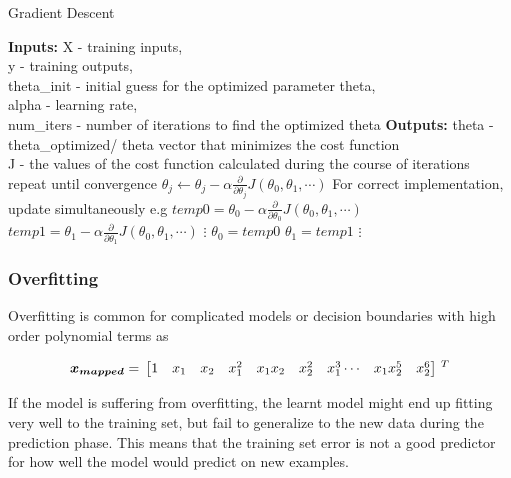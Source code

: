  \begin{algorithm}
   \caption{Gradient Descent}
    \begin{algorithmic}[1]
           \State \textbf{Inputs:} X - training inputs, \\
           \qquad \qquad y - training outputs, \\
           \qquad \qquad theta\_init - initial guess for the optimized parameter theta,\\ 
           \qquad \qquad alpha - learning rate, \\
           \qquad \qquad num\_iters - number of iterations to find the optimized theta
           \State \textbf{Outputs:} theta - theta\_optimized/ theta vector that minimizes the cost function \\
           \qquad \qquad J - the values of the cost function calculated during the course of iterations
    \State repeat until convergence {
    \State $\theta_j \leftarrow \theta_j - \alpha \frac{\partial}{\partial \theta_j}J(\theta_0, \theta_1, \cdots)$
    	 \State For correct implementation, update simultaneously e.g
	 \State 	\qquad  $temp0 = \theta_0 - \alpha \frac{\partial}{\partial \theta_0}J(\theta_0, \theta_1, \cdots)$
	 \State 	\qquad  $temp1 = \theta_1 - \alpha \frac{\partial}{\partial \theta_1}J(\theta_0, \theta_1, \cdots)$
          \State 	\qquad  \qquad $\vdots$
          \State 	\qquad  $\theta_0 = temp0$
	 \State 	\qquad  $\theta_1 = temp1$
	 \State 	\qquad  \qquad $\vdots$
		 }
       \EndFunction
\end{algorithmic}
\end{algorithm}

\subsubsection{Overfitting}

Overfitting is common for complicated models or decision boundaries with high order polynomial terms as

\begin{equation}{\label{eqn:featureMapping2}}
\bm{x_{mapped}}
=\,
\begin{bmatrix}
1 & x_1 & x_2 & x_1^2 & x_1x_2 & x_2^2 & x_1^3 \cdots & x_1x_2^5 & x_2^6 
\end{bmatrix}
\,^ T
\end{equation} 

If the model is suffering from overfitting, the learnt model might end up fitting very well to the training set, but fail to generalize to the new data during the prediction phase. 
This means that the training set error is not a good predictor for how well the model would predict on new examples.

